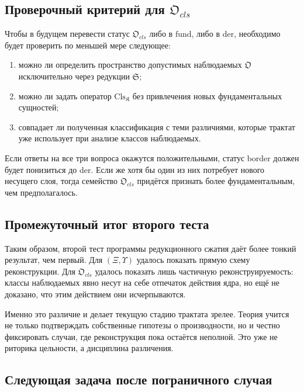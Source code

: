 \documentclass[12pt,a4paper]{article}
\begin{document}
\subsection{Проверочный критерий для \texorpdfstring{$\mathfrak{O}_{cls}$}{Ocls}}

Чтобы в будущем перевести статус \(\mathfrak{O}_{cls}\) либо в \(\mathrm{fund}\), либо в \(\mathrm{der}\), необходимо будет проверить по меньшей мере следующее:
\begin{enumerate}
    \item можно ли определить пространство допустимых наблюдаемых \(\mathfrak{O}\) исключительно через редукции \(\mathfrak{S}\);
    \item можно ли задать оператор \(\mathrm{Cls}_{\mathfrak{K}}\) без привлечения новых фундаментальных сущностей;
    \item совпадает ли полученная классификация с теми различиями, которые трактат уже использует при анализе классов наблюдаемых.
\end{enumerate}

Если ответы на все три вопроса окажутся положительными, статус \(\mathrm{border}\) должен будет понизиться до \(\mathrm{der}\). Если же хотя бы один из них потребует нового несущего слоя, тогда семейство \(\mathfrak{O}_{cls}\) придётся признать более фундаментальным, чем предполагалось.

\subsection{Промежуточный итог второго теста}

Таким образом, второй тест программы редукционного сжатия даёт более тонкий результат, чем первый. Для \((\Xi,\Upsilon)\) удалось показать прямую схему реконструкции. Для \(\mathfrak{O}_{cls}\) удалось показать лишь частичную реконструируемость: классы наблюдаемых явно несут на себе отпечаток действия ядра, но ещё не доказано, что этим действием они исчерпываются.

Именно это различие и делает текущую стадию трактата зрелее. Теория учится не только подтверждать собственные гипотезы о производности, но и честно фиксировать случаи, где реконструкция пока остаётся неполной. Это уже не риторика цельности, а дисциплина различения.

\subsection{Следующая задача после пограничного случая}
\end{document}
